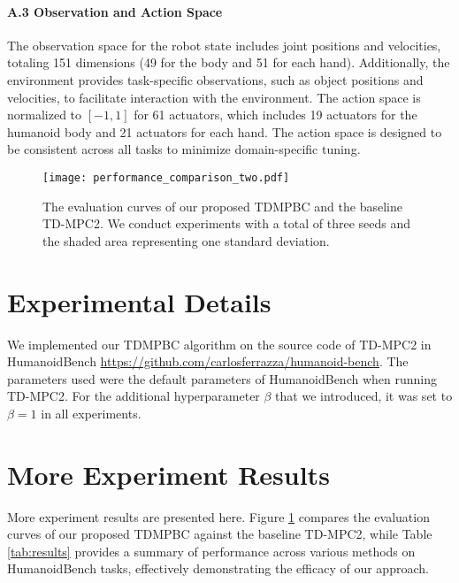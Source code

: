 \paragraph{A.3 Observation and Action Space} The observation space for the robot state includes joint positions and velocities, totaling 151 dimensions (49 for the body and 51 for each hand). Additionally, the environment provides task-specific observations, such as object positions and velocities, to facilitate interaction with the environment.
The action space is normalized to $[-1,1]$ for 61 actuators, which includes 19 actuators for the humanoid body and 21 actuators for each hand. The action space is designed to be consistent across all tasks to minimize domain-specific tuning.

\begin{figure}[htbp]
  \centering
  \hspace{-6pt}
    \texttt{[image: performance\_comparison\_two.pdf]}
  \caption{The evaluation curves of our proposed TDMPBC and the baseline TD-MPC2. We conduct experiments with a total of three seeds and the shaded area representing one standard deviation.}
  \label{fig:12}
\end{figure}



\section{Experimental Details}
We implemented our TDMPBC algorithm on the source code of TD-MPC2 in HumanoidBench \url{https://github.com/carlosferrazza/humanoid-bench}. 
The parameters used were the default parameters of HumanoidBench when running TD-MPC2. 
For the additional hyperparameter $\beta$ that we introduced, it was set to $\beta=1$ in all experiments.


\section{More Experiment Results}

More experiment results are presented here. Figure \ref{fig:12}  compares the evaluation curves of our proposed TDMPBC against the baseline TD-MPC2, while Table \ref{tab:results} provides a summary of performance across various methods on HumanoidBench tasks, effectively demonstrating the efficacy of our approach.

